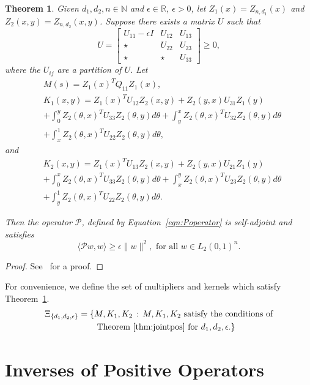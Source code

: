\documentclass[9pt,journal,twocolumn]{IEEEtran}
\newtheorem{theorem}{Theorem}
\newcommand{\lt}{L_2(0,1)}
\begin{document}
\begin{theorem}\label{thm:jointpos}
Given $d_1, d_2, n \in \mathbb{N}$ and $\epsilon \in \mathbb{R}$, $\epsilon > 0$, let $Z_1(x) = Z_{n,d_1}(x)$ and $Z_2(x,y) = Z_{n,d_2}(x,y)$.
Suppose there exists a matrix $U$ such that
\[U=\left[\begin{array}{ccc} U_{11}-\epsilon I & U_{12} & U_{13} \\
\star & U_{22} & U_{23} \\
\star & \star & U_{33}
\end{array} \right] \ge 0,\] where the $U_{ij}$ are a partition of $U$. Let
\begin{align*}
&M(s) = Z_{1}(x)^T Q_{11}Z_{1}(x),\\
&K_1(x,y) = Z_{1}(x)^T U_{12}Z_{2}(x,y) + Z_{2}(y,x)U_{31}Z_1(y)\\
&+\int_0^y Z_{2}(\theta,x)^T U_{33}Z_{2}(\theta,y)d\theta  +\int_y^x Z_{2}(\theta,x)^T U_{32}Z_{2}(\theta,y)d\theta \\
&+\int_x^1 Z_{2}(\theta,x)^T U_{22}Z_{2}(\theta,y)d\theta,
\end{align*}
and
\begin{align*}
&K_2(x,y) = Z_{1}(x)^T U_{13}Z_2(x,y) + Z_{2}(y,x)U_{21}Z_{1}(y)\\
&+\int_0^x Z_{2}(\theta,x)^T U_{33}Z_{2}(\theta,y)d\theta+  \int_x^y Z_{2}(\theta,x)^T U_{23}Z_{2}(\theta,y)d\theta \\
& +\int_y^1 Z_{2}(\theta,x)^T U_{22}Z_{2}(\theta,y)d\theta .
\end{align*}

Then the operator $\mathcal{P}$, defined by Equation~\eqref{eqn:Poperator} is  self-adjoint and satisfies
\[\langle \mathcal{P}w,w \rangle \geq \epsilon \|w\|^2, \text{ for all } w \in \lt^n.\]


\end{theorem}
\begin{proof}
See~\cite{peetlmi} for a proof.
\end{proof}

For convenience, we define the set of multipliers and kernels which satisfy Theorem~\ref{thm:jointpos}.
\begin{align*}
 \Xi_{\{d_1,d_2,\epsilon\}} =\{& M,K_1,K_2 \, : \, M,K_1,K_2 \text{ satisfy the conditions of} \\
 & \text{ Theorem~\ref{thm:jointpos} for $d_1,d_2,\epsilon$.}\}
\end{align*}

\section{Inverses of Positive Operators}
\end{document}

